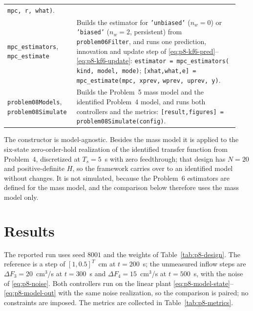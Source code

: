 \begin{table}[htbp]
\begin{tabular}{@{}p{0.27\linewidth}p{0.67\linewidth}@{}}
   \texttt{mpc, r, what)}.\\
 \texttt{mpc\_estimators}, \newline \texttt{mpc\_estimate}
 & Builds the estimator for \texttt{'unbiased'} ($n_w=0$) or
   \texttt{'biased'} ($n_w=2$, persistent) from \texttt{problem06Filter}, and
   runs one prediction, innovation and update step of
   \eqref{eq:p8-kf6-pred}--\eqref{eq:p8-kf6-update}:\newline
   \texttt{estimator = mpc\_estimators(}\newline
   \texttt{kind, model, mode)};\newline
   \texttt{[xhat,what,e] =}\newline
   \texttt{mpc\_estimate(mpc, xprev,}\newline
   \texttt{wprev, uprev, y)}.\\
 \texttt{problem08Models}, \newline \texttt{problem08Simulate}
 & Builds the Problem~5 mass model and the identified Problem~4 model, and runs
   both controllers and the metrics:\newline
   \texttt{[result,figures] =}\newline
   \texttt{problem08Simulate(config)}.\\
 \hline
 \end{tabular}
\end{table}

The constructor is model-agnostic. Besides the mass model it is applied to the
six-state zero-order-hold realization of the identified transfer function from
Problem~4, discretized at $T_s=5$~s with zero feedthrough; that design has
$N=20$ and positive-definite $H$, so the framework carries over to an identified
model without changes. It is not simulated, because the Problem~6 estimators are
defined for the mass model, and the comparison below therefore uses the mass
model only.

\section{Results}
\label{sec:p8-results}

The reported run uses seed $8001$ and the weights of
Table~\ref{tab:p8-design}. The reference is a step of $[1,0.5]^T$~cm at
$t=200$~s; the unmeasured inflow steps are $\Delta F_3=20$~cm$^3$/s at $t=300$~s
and $\Delta F_4=15$~cm$^3$/s at $t=500$~s, with the noise of
\eqref{eq:p8-noise}. Both controllers run on the linear plant
\eqref{eq:p8-model-state}--\eqref{eq:p8-model-out} with the same noise
realization, so the comparison is paired; no constraints are imposed. The
metrics are collected in Table~\ref{tab:p8-metrics}.

